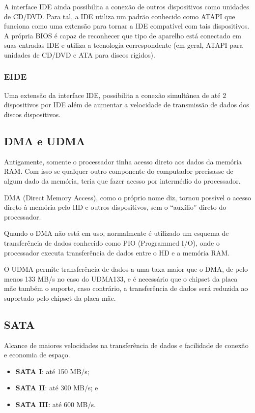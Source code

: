 \newpage

A interface IDE ainda possibilita a conexão de outros dispositivos como unidades de CD/DVD. Para tal, a IDE utiliza um padrão conhecido como ATAPI que funciona como uma extensão para tornar a IDE compatível com tais dispositivos. A própria BIOS é capaz de reconhecer que tipo de aparelho está conectado em suas entradas IDE e utiliza a tecnologia correspondente (em geral, ATAPI para unidades de CD/DVD e ATA para discos rígidos).

\subsubsection{EIDE}

Uma extensão da interface IDE, possibilita a conexão simultânea de até 2 dispositivos por IDE além de aumentar a velocidade de transmissão de dados dos discos dispositivos.

\subsection{DMA e UDMA}

Antigamente, somente o processador tinha acesso direto aos dados da memória RAM. Com isso se qualquer outro componente do computador precisasse de algum dado da memória, teria que fazer acesso por intermédio do processador.

DMA (Direct Memory Access), como o próprio nome diz, tornou possível o acesso direto à memória pelo HD e outros dispositivos, sem o ``auxílio'' direto do processador.

Quando o DMA não está em uso, normalmente é utilizado um esquema de transferência de dados conhecido como PIO (Programmed I/O), onde o processador executa transferência de dados entre o HD e a memória RAM.

O UDMA permite transferência de dados a uma taxa maior que o DMA, de pelo menos 133 MB/s no caso do UDMA133, e é necessário que o chipset da placa mãe também o suporte, caso contrário, a transferência de dados será reduzida ao suportado pelo chipset da placa mãe.

\subsection{SATA}

Alcance de maiores velocidades na transferência de dados e facilidade de conexão e economia de espaço.

\begin{itemize}
  \item \textbf{SATA I}: até 150 MB/s;
  \item \textbf{SATA II}: até 300 MB/s; e
  \item \textbf{SATA III}: até 600 MB/s.
\end{itemize}

